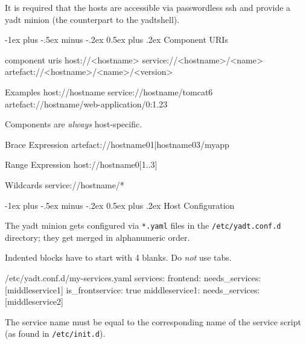 \documentclass[10pt,landscape]{article}
\makeatletter
\renewcommand{\section}{\@startsection{section}{1}{0mm}%
                                {-1ex plus -.5ex minus -.2ex}%
                                {0.5ex plus .2ex}%
                                {\normalfont\large\bfseries}}
\newcommand{\note}[2][Note]{
\begin{description}[font=\bfseries,leftmargin=1cm,style=sameline]
    \item [{#1}] {#2}
\end{description}
}
\makeatother
\begin{document}
\begin{multicols}{3}
\note{It is required that the hosts are accessible
via passwordless ssh and provide a yadt minion (the counterpart to the yadtshell).}



\section{Component URIs}

\begin{commands}{component uris}
host://<hostname>
service://<hostname>/<name>
artefact://<hostname>/<name>/<version>
\end{commands}

\begin{examples}{Examples}
host://hostname
service://hostname/tomcat6
artefact://hostname/web-application/0:1.23
\end{examples}

\note{Components are \emph{always} host-specific.}

\begin{examples}{Brace Expression}
artefact://{hostname01|hostname03}/myapp
\end{examples}

\begin{examples}{Range Expression}
host://hostname0[1..3]
\end{examples}

\begin{examples}{Wildcards}
service://hostname/*
\end{examples}



\section{Host Configuration}

The yadt minion gets configured via \verb+*.yaml+ files in the
\verb+/etc/yadt.conf.d+ directory; they get merged in alphanumeric order.

\note{Indented blocks have to start with 4 blanks. Do \emph{not} use tabs.}

\begin{examples}[showspaces=true]{/etc/yadt.conf.d/my-services.yaml}
services:
    frontend:
        needs_services: [middleservice1]
        is_frontservice: true
    middleservice1:
        needs_services: [middleservice2]
\end{examples}

The service name must be equal to the corresponding name of the
service script (as found in \verb+/etc/init.d+).


\end{multicols}
\end{document}
